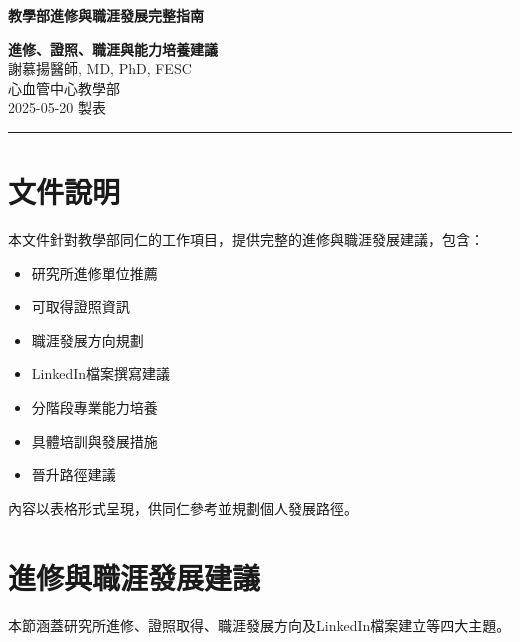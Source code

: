 \documentclass[12pt,a4paper]{article}
\begin{document}
\begin{center}
    \Huge \textbf{教學部進修與職涯發展完整指南}
    \vspace{0.5cm}
    
    \large \textbf{進修、證照、職涯與能力培養建議}\\
    
    謝慕揚醫師, MD, PhD, FESC\\
    心血管中心教學部\\
    2025-05-20 製表
    \vspace{0.3cm}
\end{center}

\vspace{0.5cm}
\noindent\rule{\textwidth}{1pt}
\vspace{0.5cm}

\section*{文件說明}
本文件針對教學部同仁的工作項目，提供完整的進修與職涯發展建議，包含：
\begin{itemize}
    \item 研究所進修單位推薦
    \item 可取得證照資訊
    \item 職涯發展方向規劃
    \item LinkedIn檔案撰寫建議
    \item 分階段專業能力培養
    \item 具體培訓與發展措施
    \item 晉升路徑建議
\end{itemize}

內容以表格形式呈現，供同仁參考並規劃個人發展路徑。

\vspace{0.5cm}

\section{進修與職涯發展建議}

本節涵蓋研究所進修、證照取得、職涯發展方向及LinkedIn檔案建立等四大主題。
\end{document}
